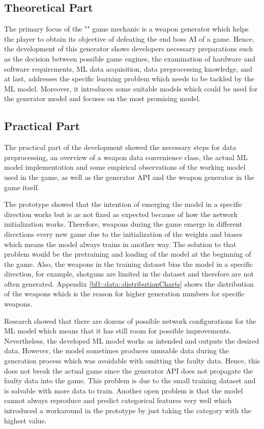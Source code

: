 \documentclass[MGS,Master,english]{twbook}%
\begin{document}
\subsection{Theoretical Part}
The primary focus of the "" game mechanic is a weapon generator which helps the player to obtain its objective of defeating the end boss AI of a game. Hence, the development of this generator shows developers necessary preparations such as the decision between possible game engines, the examination of hardware and software requirements, ML data acquisition, data preprocessing knowledge, and at last, addresses the specific learning problem which needs to be tackled by the ML model. Moreover, it introduces some suitable models which could be used for the generator model and focuses on the most promising model.

\subsection{Practical Part}
The practical part of the development showed the necessary steps for data preprocessing, an  overview of a weapon data convenience class, the actual ML model implementation and some empirical observations of the working model used in the game, as well as the generator API and the weapon generator in the game itself.

The prototype showed that the intention of emerging the model in a specific direction works but is as not fixed as expected because of how the network initialization works. Therefore, weapons during the game emerge in different directions every new game due to the initialization of the weights and biases which means the model always trains in another way. The solution to that problem would be the pretraining and loading of the model at the beginning of the game. Also, the weapons in the training dataset bias the model in a specific direction, for example, shotguns are limited in the dataset and therefore are not often generated. Appendix \ref{bf1::data::distributionCharts} shows the distribution of the weapons which is the reason for higher generation numbers for specific weapons. 

Research showed that there are dozens of possible network configurations for the ML model which means that it has still room for possible improvements. Nevertheless, the developed ML model works as intended and outputs the desired data. However, the model sometimes produces unusable data during the generation process which was avoidable with omitting the faulty data. Hence, this does not break the actual game since the generator API does not propagate the faulty data into the game. This problem is due to the small training dataset and is solvable with more data to train. Another open problem is that the model cannot always reproduce and predict categorical features very well which introduced a workaround in the prototype by just taking the category with the highest value.
\end{document}
